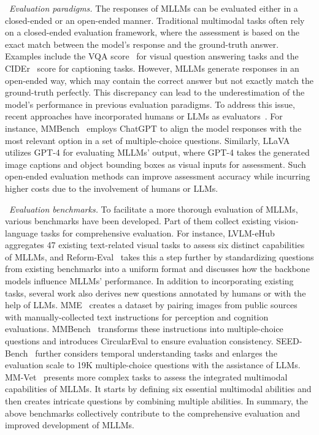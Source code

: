 {\textbullet~\emph{Evaluation paradigms.}{
The responses of MLLMs can be evaluated either in a closed-ended or an open-ended manner. 
Traditional multimodal tasks often rely on a closed-ended evaluation framework, where the assessment is based on the exact match between the model's response and the ground-truth answer. Examples include the VQA score~\cite{Antol-iccv-2015-vqa} for visual question answering tasks and the CIDEr~\cite{Vedantam-cvpr-2015-cider} score for captioning tasks. However, MLLMs generate responses in an open-ended way, which may contain the correct answer but not exactly match the ground-truth perfectly.
This discrepancy can lead to the underestimation of the model's performance in previous evaluation paradigms. To address this issue, recent approaches have incorporated humans or LLMs as evaluators~\cite {Ye-arxiv-2023-mplug}. For instance, MMBench~\cite{Liu-arxiv-2023-mmbench} employs ChatGPT to align the model responses with the most relevant option in a set of multiple-choice questions. Similarly, LLaVA~\cite{Liu-2023-arxiv-Visual} utilizes GPT-4 for evaluating MLLMs' output, where GPT-4 takes the generated image captions and object bounding boxes as visual inputs for assessment. Such open-ended evaluation methods can improve assessment accuracy while incurring higher costs due to the involvement of humans or LLMs.}

\textbullet~\emph{Evaluation benchmarks.}  {To facilitate a more thorough evaluation of MLLMs, various benchmarks have been developed. Part of them collect existing vision-language tasks for comprehensive evaluation. For instance, LVLM-eHub~\cite{Xu-arxiv-2023-lvlm} aggregates 47 existing text-related visual tasks to assess six distinct capabilities of MLLMs, and Reform-Eval~\cite{Li-arxiv-2023-reform} takes this a step further by standardizing questions from existing benchmarks into a uniform format and discusses how the backbone models influence MLLMs' performance. In addition to incorporating existing tasks, several work also derives new questions annotated by humans or with the help of LLMs. MME~\cite{Fu-arxiv-2023-mme} creates a dataset by pairing images from public sources with manually-collected text instructions for perception and cognition evaluations. MMBench~\cite{Liu-arxiv-2023-mmbench} transforms these instructions into multiple-choice questions and introduces CircularEval to ensure evaluation consistency. SEED-Bench~\cite{Li-arxiv-2023-seed}  further considers temporal understanding tasks and enlarges the evaluation scale to 19K multiple-choice questions with the assistance of LLMs. MM-Vet~\cite{Yu-arxiv-2023-mmvet}  presents more complex tasks to assess the integrated multimodal capabilities of MLLMs. It starts by defining six essential multimodal abilities and then creates intricate questions by combining multiple abilities. In summary, the above benchmarks collectively contribute to the comprehensive evaluation and improved  development of MLLMs.}

}
